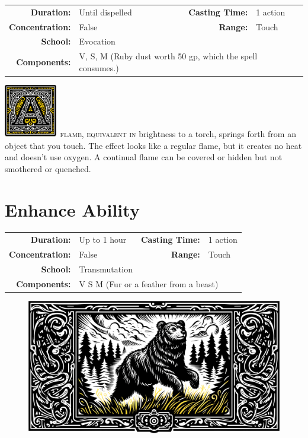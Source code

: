 \documentclass[12pt,showtrims]{memoir}
\begin{document}
{
\small\centering\vspace{-6pt}
\begin{tabular}{rlrl}
\toprule

\textbf{Duration:} & Until dispelled &
\textbf{Casting Time:} & 1 action \\
\textbf{Concentration:} & False &
\textbf{Range:} & Touch \\
\textbf{School:} & Evocation \\
\textbf{Components:} & \multicolumn{3}{p{0.7\textwidth}}{V, S, M (Ruby dust worth 50 gp, which the spell consumes.)}\\

\bottomrule
\end{tabular}
}

\vspace{1\baselineskip}\noindent
\lettrine[lines=4]{\includegraphics[height=66pt]{initials/A.png}}{\ flame, equivalent in} brightness to a torch, springs forth from an object that you touch. The effect looks like a regular flame, but it creates no heat and doesn't use oxygen. A continual flame can be covered or hidden but not smothered or quenched.

\newpage
\section*{Enhance Ability}
{
\small\centering\vspace{-6pt}
\begin{tabular}{rlrl}
\toprule

\textbf{Duration:} & Up to 1 hour &
\textbf{Casting Time:} & 1 action \\
\textbf{Concentration:} & False &
\textbf{Range:} & Touch \\
\textbf{School:} & Transmutation \\
\textbf{Components:} & \multicolumn{3}{p{0.7\textwidth}}{V S M (Fur or a feather from a beast)}\\

\bottomrule
\end{tabular}
}


\begin{figure}[b]
    \centering
    \includegraphics[width=1\textwidth]{spell_artwork/enhance_ability.png}
\end{figure}
\end{document}
